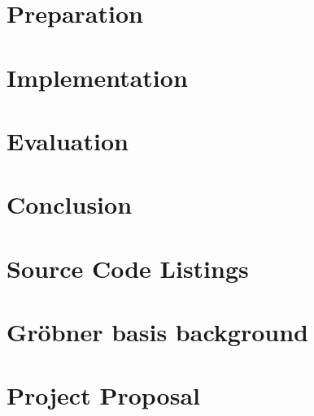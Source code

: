 \documentclass[a4paper,12pt,twoside,openany]{report}
\begin{document}
\chapter{Preparation}
\label{ch:preparation}


\chapter{Implementation}
\label{ch:implementation}


\chapter{Evaluation}
\label{ch:evaluation}


\chapter{Conclusion}
\label{ch:conclusion}



\printbibliography

\appendix

% 

\chapter{Source Code Listings}
\label{ch:appendix-code}


\chapter{Gröbner basis background}
\label{ch:grobner}


\chapter{Project Proposal}

\end{document}
